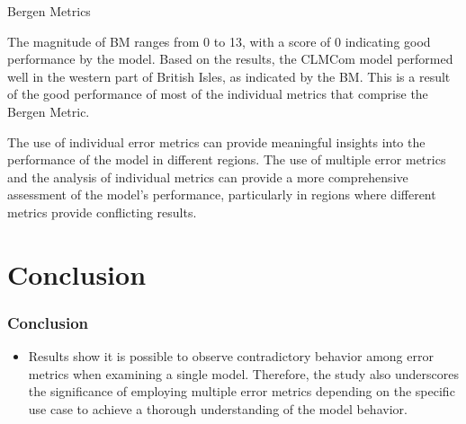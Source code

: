 \documentclass[xcolor={dvipsnames}]{beamer}
\begin{document}
\begin{frame}{Bergen Metrics}

The magnitude of BM ranges from 0 to 13, with a score of 0 indicating good performance by the model. Based on the results, the CLMCom model performed well in the western part of British Isles, as indicated by the BM. This is a result of the good performance of most of the individual metrics that comprise the Bergen Metric.

\hfill

The use of individual error metrics can provide meaningful insights into the performance of the model in different regions. The use of multiple error metrics and the analysis of individual metrics can provide a more comprehensive assessment of the model's performance, particularly in regions where different metrics provide conflicting results.
    
\end{frame}

\section{Conclusion}

\begin{frame}
\frametitle{Conclusion}

\begin{itemize}
    \item Results show it is possible to observe contradictory behavior among error metrics when examining a single model. Therefore, the study also underscores the significance of employing multiple error metrics depending on the specific use case to achieve a thorough understanding of the model behavior.

\end{itemize}

\end{frame}
\end{document}
